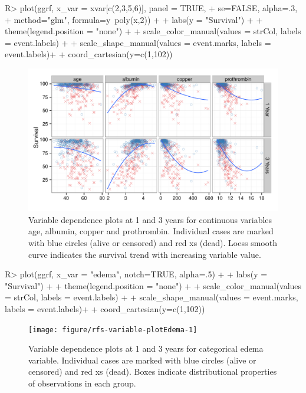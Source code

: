 \documentclass[nojss]{jss}\usepackage[]{graphicx}\usepackage[]{color}
\makeatletter
\def\maxwidth{ %
  \ifdim\Gin@nat@width>\linewidth
    \linewidth
  \else
    \Gin@nat@width
  \fi
}
\makeatother
\begin{document}
\begin{Schunk}
\begin{Sinput}
R> plot(ggrf, x_var = xvar[c(2,3,5,6)], panel = TRUE, 
+      se=FALSE, alpha=.3, 
+      method="glm", formula=y~poly(x,2)) + 
+   labs(y = "Survival") + 
+   theme(legend.position = "none") + 
+   scale_color_manual(values = strCol, labels = event.labels) + 
+   scale_shape_manual(values = event.marks, labels = event.labels)+
+   coord_cartesian(y=c(1,102))
\end{Sinput}
\begin{figure}[!htpb]

{\centering \includegraphics[width=\maxwidth]{figure/rfs-variable-plotCombines-1} 

}

\caption[Variable dependence plots at 1 and 3 years for continuous variables age, albumin, copper and prothrombin]{Variable dependence plots at 1 and 3 years for continuous variables age, albumin, copper and prothrombin. Individual cases are marked with blue circles (alive or censored) and red xs (dead). Loess smooth curve indicates the survival trend with increasing variable value.\label{fig:variable-plotCombines}}
\end{figure}
\end{Schunk}

\begin{Schunk}
\begin{Sinput}
R> plot(ggrf, x_var = "edema", notch=TRUE, alpha=.5) + 
+   labs(y = "Survival") + 
+   theme(legend.position = "none") + 
+   scale_color_manual(values = strCol, labels = event.labels) + 
+   scale_shape_manual(values = event.marks, labels = event.labels)+
+   coord_cartesian(y=c(1,102))
\end{Sinput}
\begin{figure}[!htpb]

{\centering \texttt{[image: figure/rfs-variable-plotEdema-1]} 

}

\caption[Variable dependence plots at 1 and 3 years for categorical edema variable]{Variable dependence plots at 1 and 3 years for categorical edema variable. Individual cases are marked with blue circles (alive or censored) and red xs (dead). Boxes indicate distributional properties of observations in each group.\label{fig:variable-plotEdema}}
\end{figure}
\end{Schunk}
\end{document}
